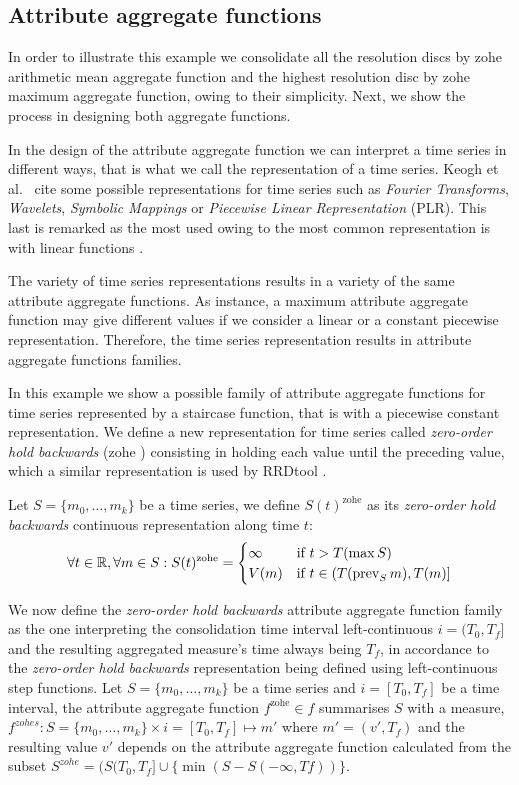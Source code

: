 \subsection{Attribute aggregate functions}

In order to illustrate this example we consolidate all the resolution
discs by zohe arithmetic mean aggregate function and the highest
resolution disc by zohe maximum aggregate function, owing to their
simplicity. Next, we show the process in designing both aggregate
functions.

In the design of the attribute aggregate function we can interpret
a time series in different ways, that is what we call the
representation of a time series. Keogh et al.\ \cite{last:keogh} cite
some possible representations for time series such as \emph{Fourier
  Transforms}, \emph{Wavelets}, \emph{Symbolic Mappings} or
\emph{Piecewise Linear Representation} (PLR). This last is remarked as
the most used owing to the most common representation is with linear
functions \cite{keogh01}.

The variety of time series representations results in a variety of the
same attribute aggregate functions. As instance, a maximum attribute
aggregate function may give different values if we consider a linear
or a constant piecewise representation. Therefore, the time series
representation results in attribute aggregate functions families.

In this example we show a possible family of attribute aggregate
functions for time series represented by a staircase function, that is
with a piecewise constant representation.  We define a new
representation for time series called \emph{zero-order hold backwards}
(zohe%
) consisting in holding each value until the preceding value, which a
similar representation is used by RRDtool \cite{lisa98:oetiker}.

Let $S=\{m_0,\ldots,m_k\}$ be a time series, we define
$S(t)^{\text{zohe}}$ as its \emph{zero-order hold backwards}
continuous representation along time $t$:
\[
\forall t \in \mathbb{R}  ,\forall m \in S:
S(t)^{\text{zohe}} =  
\begin{cases}
  \infty & \text{if } t > T(\max S) \\%
  V(m) & \text{if }  t\in (T(\prev_S m),T(m)]
\end{cases}
\]


We now define the \emph{zero-order hold backwards} attribute
aggregate function family as the one interpreting the
consolidation time interval left-continuous $i=(T_0,T_f]$ and the
resulting aggregated measure's time always being $T_f$, in
accordance to the \emph{zero-order hold backwards} representation
being defined using left-continuous step functions.  Let
$S=\{m_0,\ldots,m_k\}$ be a time series and $i=[T_0,T_f]$ be a time
interval, the attribute aggregate function $f^{\text{zohe}}\in f$
summarises $S$ with a measure, $f^{zohes}: S=\{m_0,\ldots,m_k\} \times
i=[T_0,T_f] \mapsto m'$ where $m'=(v',T_f)$ and the resulting value
$v'$ depends on the attribute aggregate function calculated from
the subset $S^{zohe}=(S(T_0,T_f] \cup \{\min(S-S(-\infty,Tf))\}$.

